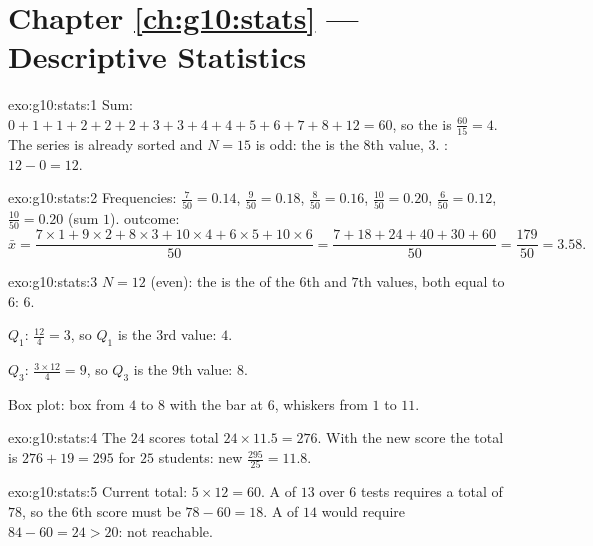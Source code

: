 \section*{Chapter \ref{ch:g10:stats} --- Descriptive Statistics}

\begin{solution}{exo:g10:stats:1}
Sum: $0+1+1+2+2+2+3+3+4+4+5+6+7+8+12 = 60$, so the  is
$\frac{60}{15} = 4$. The series is already sorted and $N = 15$ is odd:
the  is the $8$th value, $3$. : $12 - 0 = 12$.
\end{solution}

\begin{solution}{exo:g10:stats:2}
Frequencies: $\frac{7}{50} = 0.14$, $\frac{9}{50} = 0.18$,
$\frac{8}{50} = 0.16$, $\frac{10}{50} = 0.20$, $\frac{6}{50} = 0.12$,
$\frac{10}{50} = 0.20$ (sum $1$).  outcome:
\[
\bar x = \frac{7 \times 1 + 9 \times 2 + 8 \times 3 + 10 \times 4
+ 6 \times 5 + 10 \times 6}{50}
= \frac{7 + 18 + 24 + 40 + 30 + 60}{50}
= \frac{179}{50} = 3.58 .
\]
\end{solution}

\begin{solution}{exo:g10:stats:3}
$N = 12$ (even): the  is the  of the $6$th and $7$th
values, both equal to $6$:  $6$.

$Q_1$: $\frac{12}{4} = 3$, so $Q_1$ is the $3$rd value: $4$.

$Q_3$: $\frac{3 \times 12}{4} = 9$, so $Q_3$ is the $9$th value: $8$.

Box plot: box from $4$ to $8$ with the  bar at $6$, whiskers from
$1$ to $11$.
\end{solution}

\begin{solution}{exo:g10:stats:4}
The $24$ scores total $24 \times 11.5 = 276$. With the new score the
total is $276 + 19 = 295$ for $25$ students: new 
$\frac{295}{25} = 11.8$.
\end{solution}

\begin{solution}{exo:g10:stats:5}
Current total: $5 \times 12 = 60$. A  of $13$ over $6$ tests requires
a total of $78$, so the $6$th score must be $78 - 60 = 18$. A  of
$14$ would require $84 - 60 = 24 > 20$: not reachable.
\end{solution}

